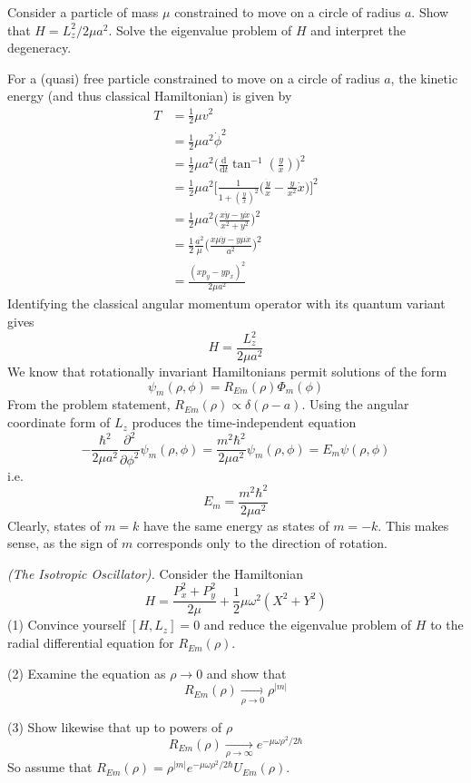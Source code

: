 \documentclass[../principles-of-quantum-mechanics.tex]{subfiles}
\begin{document}
\begin{questions}
	\question Consider a particle of mass $\mu$ constrained to move on a circle of radius $a$. Show that $H = L_z^2/2\mu a^2$. Solve the eigenvalue problem of $H$ and interpret the degeneracy.
	\begin{solution}
		For a (quasi) free particle constrained to move on a circle of radius $a$, the kinetic energy (and thus classical Hamiltonian) is given by
		\begin{align*}
			T &= \frac{1}{2}\mu v^2 \\
			&= \frac{1}{2}\mu a^2\dot{\phi}^2 \\
			&= \frac{1}{2}\mu a^2\Big(\frac{\mathrm{d}}{\mathrm{d}t}\tan^{-1}(\tfrac{y}{x})\Big)^2 \\
			&= \frac{1}{2}\mu a^2\Big[\frac{1}{1 + (\tfrac{y}{x})^2}\Big(\frac{\dot{y}}{x} - \frac{y}{x^2}\dot{x}\Big)\Big]^2 \\
			&= \frac{1}{2}\mu a^2\Big(\frac{x\dot{y} - y\dot{x}}{x^2 + y^2}\Big)^2 \\
			&= \frac{1}{2}\frac{a^2}{\mu}\Big(\frac{x\mu\dot{y} - y\mu\dot{x}}{a^2}\Big)^2 \\
			&= \frac{(xp_y - yp_x)^2}{2\mu a^2}
		\end{align*}
		Identifying the classical angular momentum operator with its quantum variant gives
		$$H = \frac{L_z^2}{2\mu a^2}$$
		We know that rotationally invariant Hamiltonians permit solutions of the form
		$$\psi_m(\rho, \phi) = R_{\textit{Em}}(\rho)\Phi_m(\phi)$$
		From the problem statement, $R_{\textit{Em}}(\rho)\propto\delta(\rho - a)$. Using the angular coordinate form of $L_z$ produces the time-independent equation
		$$-\frac{\hbar^2}{2\mu a^2}\frac{\partial^2}{\partial\phi^2}\psi_m(\rho, \phi) = \frac{m^2\hbar^2}{2\mu a^2}\psi_m(\rho, \phi) = E_m\psi(\rho, \phi)$$
		i.e. 
		$$E_m = \frac{m^2\hbar^2}{2\mu a^2}$$
		Clearly, states of $m = k$ have the same energy as states of $m = -k$. This makes sense, as the sign of $m$ corresponds only to the direction of rotation.
	\end{solution}
	
	\question \textit{(The Isotropic Oscillator).} Consider the Hamiltonian
	$$H = \frac{P_x^2 + P_y^2}{2\mu} + \frac{1}{2}\mu\omega^2(X^2 + Y^2)$$
	(1) Convince yourself $[H, L_z] = 0$ and reduce the eigenvalue problem of $H$ to the radial differential equation for $R_{\textit{Em}}(\rho)$.
	
	(2) Examine the equation as $\rho \to 0$ and show that
	$$R_{\textit{Em}}(\rho)\xrightarrow[\rho \to 0]{} \rho^{|m|}$$
	
	(3) Show likewise that up to powers of $\rho$
	$$R_{\textit{Em}}(\rho)\xrightarrow[\rho\to\infty]{} e^{-\mu\omega\rho^2/2\hbar}$$
	So assume that $R_{\textit{Em}}(\rho) = \rho^{|m|}e^{-\mu\omega\rho^2/2\hbar}U_{\textit{Em}}(\rho)$.
	

\end{questions}
\end{document}
